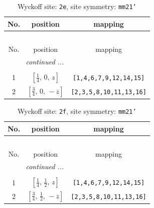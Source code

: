 \documentclass[fleqn,8pt]{jsarticle}
\begin{document}
\begin{longtable}{ccc}
\caption{Wyckoff site: {\tt 2e}, site symmetry: {\tt mm21'}}
 \\
 \hline \hline
No. & position & mapping \\ \hline \endfirsthead

\multicolumn{2}{l}{\tablename\ \thetable{}} \\
 \hline \hline
No. & position & mapping \\ \hline \endhead

 \hline \hline
\multicolumn{2}{r}{\footnotesize\it continued ...} \\ \endfoot

 \hline \hline
\multicolumn{2}{r}{} \\ \endlastfoot

1 & $\left[ \frac{1}{4},\, 0,\, z \right]$ & {\tt [1,4,6,7,9,12,14,15]} \\ \hline
2 & $\left[ \frac{3}{4},\, 0,\, - z \right]$ & {\tt [2,3,5,8,10,11,13,16]} \\
\end{longtable}
\renewcommand{\arraystretch}{1.2}
\begin{longtable}{ccc}
\caption{Wyckoff site: {\tt 2f}, site symmetry: {\tt mm21'}}
 \\
 \hline \hline
No. & position & mapping \\ \hline \endfirsthead

\multicolumn{2}{l}{\tablename\ \thetable{}} \\
 \hline \hline
No. & position & mapping \\ \hline \endhead

 \hline \hline
\multicolumn{2}{r}{\footnotesize\it continued ...} \\ \endfoot

 \hline \hline
\multicolumn{2}{r}{} \\ \endlastfoot

1 & $\left[ \frac{1}{4},\, \frac{1}{2},\, z \right]$ & {\tt [1,4,6,7,9,12,14,15]} \\ \hline
2 & $\left[ \frac{3}{4},\, \frac{1}{2},\, - z \right]$ & {\tt [2,3,5,8,10,11,13,16]} \\
\end{longtable}
\renewcommand{\arraystretch}{1.2}
\end{document}
